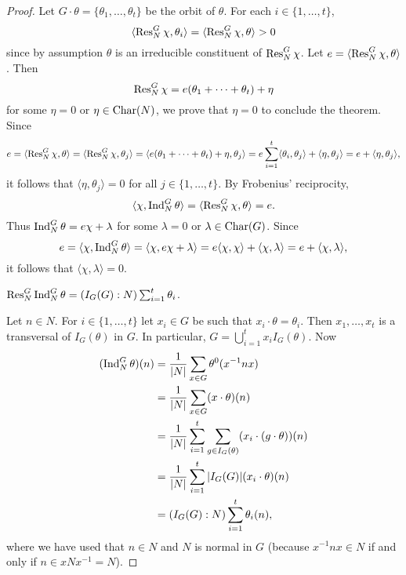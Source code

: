 \begin{proof}
    Let $G\cdot\theta=\{\theta_1,\dots,\theta_t\}$ be the 
    orbit of $\theta$. For each $i\in\{1,\dots,t\}$, 
    \[
    \langle\operatorname{Res}_N^G\chi,\theta_i\rangle 
    =\langle \operatorname{Res}_N^G\chi,\theta\rangle>0
    \]
    since by assumption $\theta$ is an irreducible constituent of $\operatorname{Res}_N^G\chi$. 
    Let $e=\langle\operatorname{Res}_N^G\chi,\theta\rangle$. Then 
    \[
    \operatorname{Res}_N^G\chi=e(\theta_1+\cdots+\theta_t)+\eta
    \]
    for some $\eta=0$ or $\eta\in\operatorname{Char}(N)$, we prove that $\eta=0$ to conclude the theorem. Since 
    \[
    e=\langle\operatorname{Res}_N^G\chi,\theta\rangle = \langle\operatorname{Res}_N^G\chi,\theta_j\rangle
    =\langle e(\theta_1+\cdots+\theta_t)+\eta,\theta_j\rangle
    =e\sum_{i=1}^t\langle\theta_i,\theta_j\rangle+\langle\eta,\theta_j\rangle
    =e+\langle\eta,\theta_j\rangle,
    \]
    it follows that $\langle\eta,\theta_j\rangle=0$ for all $j \in \{1, \dots, t\}$. By Frobenius' reciprocity, 
    \[
    \langle\chi,\operatorname{Ind}_N^G\theta\rangle
    =\langle\operatorname{Res}_N^G\chi,\theta\rangle=e.
    \]
    Thus $\operatorname{Ind}_N^G\theta=e\chi+\lambda$  
    for some $\lambda=0$ or $\lambda\in\operatorname{Char}(G)$. Since 
    \[
    e=\langle\chi,\operatorname{Ind}_N^G\theta\rangle 
    =\langle\chi, e\chi+\lambda\rangle
    =e\langle\chi,\chi\rangle+\langle\chi,\lambda\rangle 
    =e+\langle\chi,\lambda\rangle,
    \]
    it follows that $\langle\chi,\lambda\rangle=0$.

    \begin{claim}
        $\operatorname{Res}_N^G\operatorname{Ind}_N^G\theta=(I_G(G):N)\sum_{i=1}^t\theta_i$.
    \end{claim}

    Let $n\in N$. For $i\in\{1,\dots,t\}$ let 
    $x_i\in G$ be such that $x_i\cdot\theta=\theta_i$. Then 
    $x_1,\dots,x_t$ is a transversal of $I_G(\theta)$ in $G$. In particular, 
    $G=\bigcup_{i=1}^tx_iI_G(\theta)$. 
    Now  
    \begin{align*}
        (\operatorname{Ind}_N^G\theta)(n) &= \frac{1}{|N|}\sum_{x\in G}\theta^0(x^{-1}nx)\\
        &=\frac{1}{|N|}\sum_{x\in G}(x\cdot\theta)(n)\\
        &=\frac{1}{|N|}\sum_{i=1}^t\sum_{g\in I_G(\theta)}(x_i\cdot (g\cdot\theta))(n)\\
        &=\frac{1}{|N|}\sum_{i=1}^t|I_G(G)|(x_i\cdot \theta)(n)\\
        &=(I_G(G):N)\sum_{i=1}^t\theta_i(n), 
    \end{align*}
    where we have used that $n\in N$ and $N$ is normal in $G$ (because $x^{-1}nx\in N$ if and only if
    $n\in xNx^{-1}=N$). 


\end{proof}
